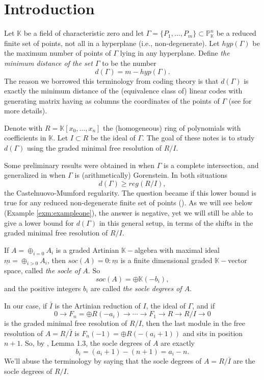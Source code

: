 \documentclass[12pt]{amsart}
\begin{document}
\section{Introduction}

Let $\mathbb K$ be a field of characteristic zero and let $\Gamma=\{P_1,\ldots,P_m\}\subset \mathbb P^n_{\mathbb K}$ be a reduced finite set of points, not all in a hyperplane (i.e., non-degenerate). Let $hyp(\Gamma)$ be the maximum number of points of $\Gamma$ lying in any hyperplane. Define \textit{the minimum distance of the set $\Gamma$} to be the number $$d(\Gamma)=m-hyp(\Gamma).$$ The reason we borrowed this terminology from coding theory is that $d(\Gamma)$ is exactly the minimum distance of the (equivalence class of) linear codes with generating matrix having as columns the coordinates of the points of $\Gamma$ (see \cite{tvn} for more details).

Denote with $R=\mathbb K[x_0,\ldots,x_n]$ the (homogeneous) ring of polynomials with coefficients in $\mathbb K$. Let $I\subset R$ be the ideal of $\Gamma$. The goal of these notes is to study $d(\Gamma)$ using the graded minimal free resolution of $R/I$.

Some preliminary results were obtained in \cite{gls} when $\Gamma$ is a complete intersection, and generalized in \cite{t1} when $\Gamma$ is (arithmetically) Gorenstein. In both situations $$d(\Gamma)\geq reg(R/I),$$ the Castelnuovo-Mumford regularity. The question became if this lower bound is true for any reduced non-degenerate finite set of points (\cite{t2}). As we will see below (Example \ref{exm:exampleone}), the answer is negative, yet we will still be able to give a lower bound for $d(\Gamma)$ in this general setup, in terms of the shifts in the graded minimal free resolution of $R/I$.

If $A=\displaystyle\oplus_{i=0}A_i$ is a graded Artinian $\mathbb K-$algebra with maximal ideal $\underline{m}=\displaystyle\oplus_{i>0}A_i$, then $soc(A)=0:\underline{m}$ is a finite dimensional graded $\mathbb K-$vector space, called \textit{the socle of $A$}. So $$soc(A)=\oplus\mathbb K(-b_i),$$ and the positive integers $b_i$ are called \textit{the socle degrees of $A$}.

In our case, if $\bar{I}$ is the Artinian reduction of $I$, the ideal of $\Gamma$, and if $$0\rightarrow F_n=\oplus R(-a_i)\rightarrow\cdots\rightarrow F_1\rightarrow R\rightarrow R/I\rightarrow 0$$ is the graded minimal free resolution of $R/I$, then the last module in the free resolution of $A=R/\bar{I}$ is $F_n(-1)=\oplus R(-(a_i+1))$ and sits in position $n+1$. So, by \cite{ku}, Lemma 1.3, the socle degrees of $A$ are exactly $$b_i=(a_i+1)-(n+1)=a_i-n.$$ We'll abuse the terminology by saying that the socle degrees of $A=R/\bar{I}$ are the socle degrees of $R/I$.
\end{document}
